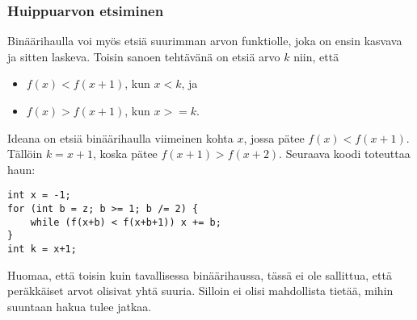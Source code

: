 \subsubsection{Huippuarvon etsiminen}

Binäärihaulla voi myös etsiä
suurimman arvon funktiolle,
joka on ensin kasvava ja sitten laskeva.
Toisin sanoen tehtävänä on etsiä arvo
$k$ niin, että

\begin{itemize}
\item
$f(x)<f(x+1)$, kun $x<k$, ja
\item
$f(x)>f(x+1)$, kun $x >= k$.
\end{itemize}

Ideana on etsiä binäärihaulla
viimeinen kohta $x$,
jossa pätee $f(x)<f(x+1)$.
Tällöin $k=x+1$,
koska pätee $f(x+1)>f(x+2)$.
Seuraava koodi toteuttaa haun: 

\begin{lstlisting}
int x = -1;
for (int b = z; b >= 1; b /= 2) {
    while (f(x+b) < f(x+b+1)) x += b;
}
int k = x+1;
\end{lstlisting}

Huomaa, että toisin kuin tavallisessa binäärihaussa,
tässä ei ole sallittua,
että peräkkäiset arvot olisivat yhtä suuria.
Silloin ei olisi mahdollista tietää,
mihin suuntaan hakua tulee jatkaa.

